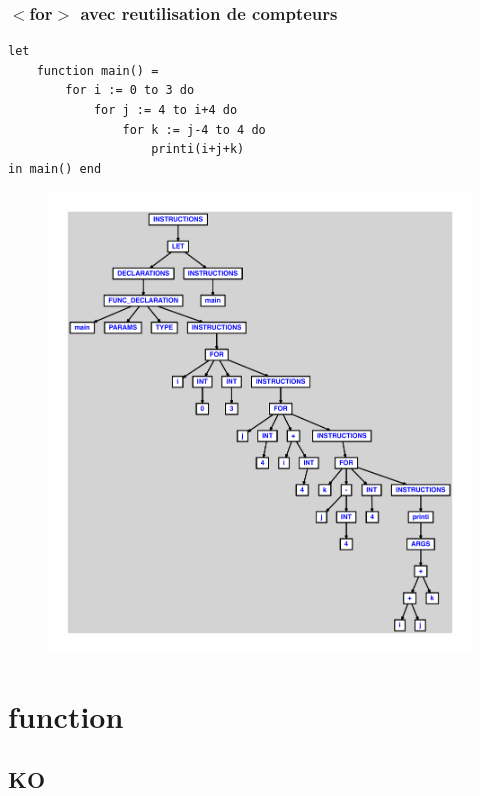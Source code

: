 \documentclass{article}
\begin{document}
\subsubsection{$ < $for$ > $ avec reutilisation de compteurs}
\begin{lstlisting}
let
	function main() =
		for i := 0 to 3 do
			for j := 4 to i+4 do
				for k := j-4 to 4 do
					printi(i+j+k)
in main() end
\end{lstlisting}
\newpage
\begin{figure}[H]
\centering
\includegraphics[max width=\textwidth]{ast/ast_212.pdf}
\end{figure}
\newpage
\section{function}
\subsection{KO}
\end{document}
